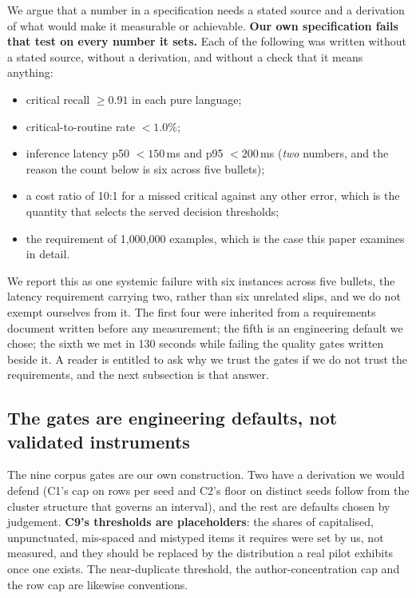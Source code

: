 We argue that a number in a specification needs a stated source and a derivation
of what would make it measurable or achievable. \textbf{Our own specification
fails that test on every number it sets.} Each of the following was written
without a stated source, without a derivation, and without a check that it means
anything:

\begin{itemize}
\item critical recall $\geq 0.91$ in each pure language;
\item critical-to-routine rate $< 1.0\%$;
\item inference latency p50 $< 150$\,ms and p95 $< 200$\,ms (\emph{two} numbers, and the reason the count below is six across five bullets);
\item a cost ratio of 10:1 for a missed critical against any other error, which
  is the quantity that selects the served decision thresholds;
\item the requirement of 1{,}000{,}000 examples, which is the case this paper
  examines in detail.
\end{itemize}

We report this as one systemic failure with six instances across five bullets,
the latency requirement carrying two, rather than six
unrelated slips, and we do not exempt ourselves from it. The first four were
inherited from a requirements document written before any measurement; the fifth
is an engineering default we chose; the sixth we met in 130 seconds while failing
the quality gates written beside it. A reader is entitled to ask why we trust the
gates if we do not trust the requirements, and the next subsection is that answer.

\subsection{The gates are engineering defaults, not validated instruments}

The nine corpus gates are our own construction. Two have a derivation we would
defend (C1's cap on rows per seed and C2's floor on distinct seeds follow from
the cluster structure that governs an interval), and the rest are defaults
chosen by judgement. \textbf{C9's thresholds are placeholders}: the shares of
capitalised, unpunctuated, mis-spaced and mistyped items it requires were set by
us, not measured, and they should be replaced by the distribution a real pilot
exhibits once one exists. The near-duplicate threshold, the author-concentration
cap and the row cap are likewise conventions.

